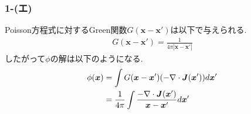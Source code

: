 \subsubsection*{1-(エ)}
Poisson方程式に対するGreen関数$G({\bm x}-{\bm x'})$は以下で与えられる.
\begin{align*}
  G({\bm x}-{\bm x'})=\frac{1}{4\pi|{\bm x}-{\bm x'}|}
\end{align*}
したがって$\phi$の解は以下のようになる.
\begin{align*}
  \phi({\bm x}) & =\int G({\bm x}-{\bm x'})(-\nabla\cdot {\bm J}({\bm x'}))d{\bm x'}                   \\
                & =\frac{1}{4\pi}\int \frac{-\nabla\cdot {\bm J}({\bm x'})}{{\bm x}-{\bm x'}}d{\bm x'}
\end{align*}
